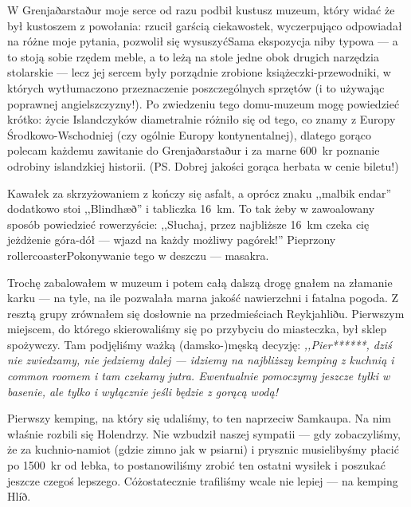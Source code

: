 W Grenjaðarstaður moje serce od razu podbił kustusz muzeum, który widać że był kustoszem z powołania: rzucił garścią ciekawostek, wyczerpująco odpowiadał na różne moje pytania, pozwolił się wysuszyć\textellipsis Sama ekspozycja niby typowa --- a to stoją sobie rzędem meble, a to leżą na stole jedne obok drugich narzędzia stolarskie --- lecz jej sercem były porządnie zrobione książeczki-przewodniki, w których wytłumaczono przeznaczenie poszczególnych sprzętów (i to używając poprawnej angielszczyzny!). Po zwiedzeniu tego domu-muzeum mogę powiedzieć krótko: życie Islandczyków diametralnie różniło się od tego, co znamy z Europy Środkowo-Wschodniej (czy ogólnie Europy kontynentalnej), dlatego gorąco polecam każdemu zawitanie do Grenjaðarstaður i za marne 600~kr poznanie odrobiny islandzkiej historii. (PS. Dobrej jakości gorąca herbata w cenie biletu!)

Kawałek za skrzyżowaniem  z  kończy się asfalt, a oprócz znaku ,,malbik endar'' dodatkowo stoi ,,Blindhæð'' i tabliczka 16~km. To tak żeby w zawoalowany sposób powiedzieć rowerzyście: ,,Słuchaj, przez najbliższe 16~km czeka cię jeżdżenie góra-dół --- wjazd na każdy możliwy pagórek!'' Pieprzony rollercoaster\textellipsis Pokonywanie tego w deszczu --- masakra.


Trochę zabalowałem w muzeum i potem całą dalszą drogę gnałem na złamanie karku --- na tyle, na ile pozwalała marna jakość nawierzchni i fatalna pogoda. Z resztą grupy zrównałem się dosłownie na przedmieściach Reykjahliðu. Pierwszym miejscem, do którego skierowaliśmy się po przybyciu do miasteczka, był sklep spożywczy. Tam podjęliśmy ważką \mbox{(damsko-)}męską decyzję: \emph{,,Pier******, dziś nie zwiedzamy, nie jedziemy dalej --- idziemy na najbliższy kemping z kuchnią i common roomem i tam czekamy jutra. Ewentualnie pomoczymy jeszcze tyłki w basenie, ale tylko i wyłącznie jeśli będzie z gorącą wodą!}

Pierwszy kemping, na który się udaliśmy, to ten naprzeciw Samkaupa. Na nim właśnie rozbili się Holendrzy. Nie wzbudził naszej sympatii --- gdy zobaczyliśmy, że za kuchnio-namiot (gdzie zimno jak w psiarni) i prysznic musielibyśmy płacić po 1500~kr od łebka, to postanowiliśmy zrobić ten ostatni wysiłek i poszukać jeszcze czegoś lepszego. Cóż\textellipsis osta\-tecznie trafiliśmy wcale nie lepiej --- na kemping Hlíð.

